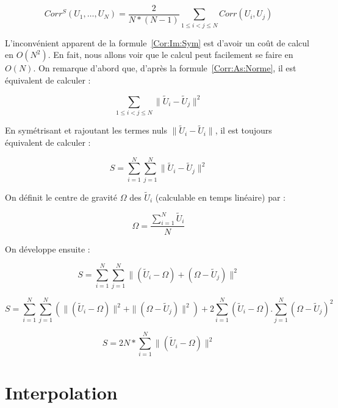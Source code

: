 \begin{equation}
   Corr^S(U_1,\dots,U_N) =  
    \frac{2}{N*(N-1)} \sum_{1\leq i < j \leq N} Corr(U_i,U_j)
   \label{Cor:Im:Sym}
\end{equation}

L'inconv\'enient apparent de la formule~\ref{Cor:Im:Sym} est d'avoir
un co\^ut de calcul en $O(N^2)$. En fait, nous allons voir que
le calcul peut facilement se faire en $O(N)$. On remarque d'abord
que, d'apr\`es la formule~\ref{Corr:As:Norme}, il est \'equivalent
de calculer :

\begin{equation}
    \sum_{1\leq i < j \leq N} \|\tilde{U}_i-\tilde{U}_j\|^2 
\end{equation}


En sym\'etrisant et rajoutant les termes nuls  $\|\tilde{U}_i-\tilde{U}_i\|$,
il est toujours \'equivalent de calculer :

\begin{equation}
    S=\sum_{i=1}^N \sum_{j=1}^N  \|\tilde{U}_i-\tilde{U}_j\|^2 
\end{equation}

On d\'efinit le centre de gravit\'e $\Omega$ des $\tilde{U}_i$
(calculable en temps lin\'eaire) par :

\begin{equation}
    \Omega = \frac{\sum_{i=1}^N \tilde{U}_i}{N}
\end{equation}

On d\'eveloppe ensuite :

\begin{equation}
    S=\sum_{i=1}^N \sum_{j=1}^N  \|(\tilde{U}_i-\Omega) +(\Omega-\tilde{U}_j)\|^2 
\end{equation}

\begin{equation}
    S= \sum_{i=1}^N \sum_{j=1}^N  (\|(\tilde{U}_i-\Omega)\|^2 +\|(\Omega-\tilde{U}_j)\|^2 )
       +2\sum_{i=1}^N  (\tilde{U}_i-\Omega). \sum_{j=1}^N  (\Omega-\tilde{U}_j)^2
\end{equation}

\begin{equation}
    S= 2N * \sum_{i=1}^N  \|(\tilde{U}_i-\Omega) \|^2 
\end{equation}


\section{Interpolation}

